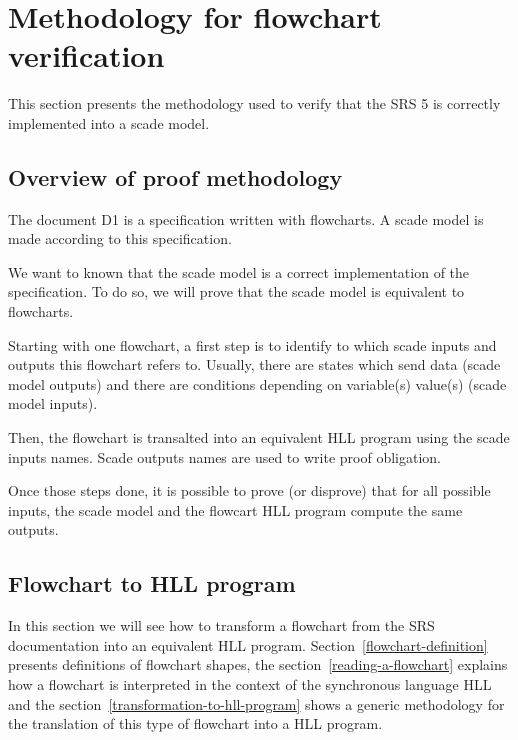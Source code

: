\section{Methodology for flowchart verification}
\label{methodology}
This section presents the methodology used to verify that the SRS 5 is
correctly implemented into a scade model.

\subsection{Overview of proof methodology}
\label{overview}
The document D1 is a specification written with flowcharts. A scade
model is made according to this specification.

We want to known that the scade model is a correct implementation of
the specification. To do so, we will prove that the scade model
is equivalent to flowcharts.


Starting with one flowchart, a first step is to identify to which
scade inputs and outputs this flowchart refers to. Usually, there are
states which send data (scade model outputs) and there are conditions
depending on variable(s) value(s) (scade model inputs).

Then, the flowchart is transalted into an equivalent HLL program using
the scade inputs names. Scade outputs names are used to write proof
obligation.

Once those steps done, it is possible to prove (or disprove) that for
all possible inputs, the scade model and the flowcart HLL program
compute the same outputs.


\subsection{Flowchart to HLL program}
\label{flowchart-2-hll}
In this section we will see how to transform a flowchart from the SRS
documentation into an equivalent HLL
program. Section~\ref{flowchart-definition} presents definitions of
flowchart shapes, the section~\ref{reading-a-flowchart} explains how a
flowchart is interpreted in the context of the synchronous language
HLL and the section~\ref{transformation-to-hll-program} shows a
generic methodology for the translation of this type of flowchart into
a HLL program.
